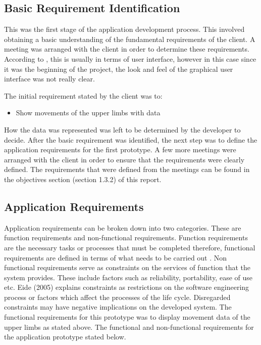 \documentclass[a4paper, 12pt]{article}
\begin{document}
\subsection{Basic Requirement Identification}
This was the first stage of the application development process. This involved obtaining a basic understanding of the fundamental requirements of the client. A meeting was arranged with the client in order to determine these requirements. According to \citet{Sabale2012}, this is usually in terms of user interface, however in this case since it was the beginning of the project, the look and feel of the graphical user interface was not really clear.

The initial requirement stated by the client was to: 
\begin{itemize}
 \item Show movements of the upper limbs with data
\end{itemize} 

How the data was represented was left to be determined by the developer to decide. After the basic requirement was identified, the next step was to define the application requirements for the first prototype. A few more meetings were arranged with the client in order to ensure that the requirements were clearly defined. The requirements that were defined from the meetings can be found in the objectives section (section 1.3.2) of this report. 



\subsection{Application Requirements}
Application requirements can be broken down into two categories. These are function requirements and non-functional requirements. Function requirements are the necessary tasks or processes that must be completed therefore, functional requirements are defined in terms of what needs to be carried out \citep{Defence2001}. Non functional requirements serve as constraints on the services of function that the system provides. These include factors such as reliability, portability, ease of use etc. Eide (2005) explains constraints as restrictions on the software engineering process or factors which affect the processes of the life cycle. Disregarded constraints may have negative implications on the developed system. The functional requirements for this prototype was to display movement data of the upper limbs as stated above. The functional and non-functional requirements for the application prototype stated below. 
\end{document}
